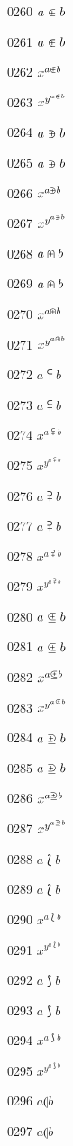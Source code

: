 \documentclass{article}
\begin{document}
0260 $a\inplus b$\par
0261 $\displaystyle a\inplus b$\par
0262 $x^{a\inplus b}$\par
0263 $x^{y^{a\inplus b}}$\par
0264 $a\niplus b$\par
0265 $\displaystyle a\niplus b$\par
0266 $x^{a\niplus b}$\par
0267 $x^{y^{a\niplus b}}$\par
0268 $a\nplus b$\par
0269 $\displaystyle a\nplus b$\par
0270 $x^{a\nplus b}$\par
0271 $x^{y^{a\nplus b}}$\par
0272 $a\subsetplus b$\par
0273 $\displaystyle a\subsetplus b$\par
0274 $x^{a\subsetplus b}$\par
0275 $x^{y^{a\subsetplus b}}$\par
0276 $a\supsetplus b$\par
0277 $\displaystyle a\supsetplus b$\par
0278 $x^{a\supsetplus b}$\par
0279 $x^{y^{a\supsetplus b}}$\par
0280 $a\subsetpluseq b$\par
0281 $\displaystyle a\subsetpluseq b$\par
0282 $x^{a\subsetpluseq b}$\par
0283 $x^{y^{a\subsetpluseq b}}$\par
0284 $a\supsetpluseq b$\par
0285 $\displaystyle a\supsetpluseq b$\par
0286 $x^{a\supsetpluseq b}$\par
0287 $x^{y^{a\supsetpluseq b}}$\par
0288 $a\Lbag b$\par
0289 $\displaystyle a\Lbag b$\par
0290 $x^{a\Lbag b}$\par
0291 $x^{y^{a\Lbag b}}$\par
0292 $a\Rbag b$\par
0293 $\displaystyle a\Rbag b$\par
0294 $x^{a\Rbag b}$\par
0295 $x^{y^{a\Rbag b}}$\par
0296 $a\llparenthesis b$\par
0297 $\displaystyle a\llparenthesis b$\par
\end{document}
